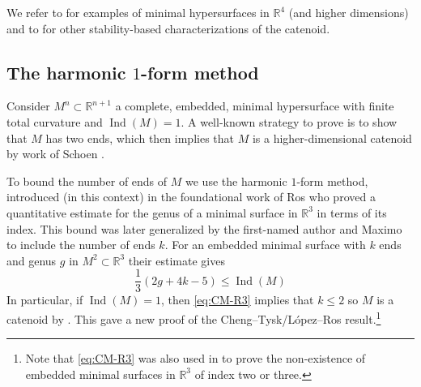 \documentclass[11pt]{amsart}
\numberwithin{equation}{section}
\theoremstyle{plain}
\theoremstyle{definition}
\theoremstyle{remark}
\newcommand{\R}{\mathbb{R}}
\DeclareMathOperator{\Ind}{Ind}
\begin{document}
We refer to \cite{FakhiPacard,Coutant12,AryanMcWeeney26} for examples of minimal hypersurfaces in $\R^4$ (and higher dimensions) and to \cite{ChengZhou2009,HongLiWang2024,CMMR:splitting} for other stability-based characterizations of the catenoid. 

\subsection{The harmonic $1$-form method} Consider $M^n\subset \R^{n+1}$ a complete, embedded, minimal hypersurface with finite total curvature and $\Ind(M) = 1$. A well-known strategy to prove  is to show that $M$ has two ends, which then implies that $M$ is a higher-dimensional catenoid by work of Schoen \cite{Schoen1983}.

To bound the number of ends of $M$ we use the harmonic $1$-form method, introduced (in this context) in the foundational work of Ros \cite{Ros2006} who proved a quantitative estimate for the genus of a minimal surface in $\R^3$ in terms of its index. This bound was later generalized by the first-named author and Maximo \cite{ChodoshMaximo2016,ChodoshMaximo2023} to include the number of ends $k$. For an embedded minimal surface with $k$ ends and genus $g$ in $M^2\subset \R^3$ their estimate gives 
\begin{equation}\label{eq:CM-R3}
\frac 13 (2g + 4k - 5)\leq \Ind(M)
\end{equation}
In particular, if $\Ind(M) = 1$, then \eqref{eq:CM-R3} implies that $k\leq 2$ so $M$ is a catenoid by \cite{Schoen1983}. This gave a new proof of the Cheng--Tysk/L\'opez--Ros \cite{ChengTysk1988,LopezRos1989} result.\footnote{Note that \eqref{eq:CM-R3} was also used in \cite{ChodoshMaximo2023} to prove the non-existence of embedded minimal surfaces in $\R^3$ of index two or three.} 
\end{document}
